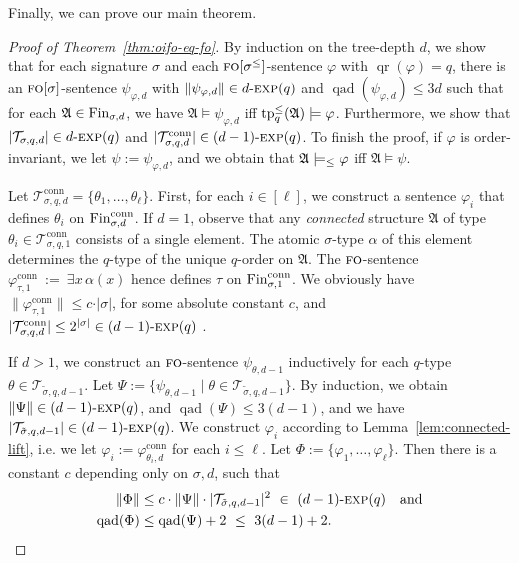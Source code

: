 \documentclass[11pt]{article}
\renewcommand{\phi}{\varphi}
\newcommand{\fin}{\textup{Fin}}
\newcommand{\conn}{\text{conn}}
\newcommand{\logic}[1]{\textsc{#1}}
\newcommand{\FO}{\logic{fo}}
\newcommand{\types}[1][\sigma,q,d]{\mathcal{T}_{#1}}
\newcommand{\ctypes}[1][\sigma,q,d]{\mathcal{T}^{\conn}_{#1}}
\newcommand{\size}[1]{\|#1\|}
\newcommand{\qr}[1]{\operatorname{qr}(#1)}
\newcommand{\qad}[1]{\operatorname{qad}(#1)}
\newcommand{\st}{\mathbin |}
\newcommand{\absval}[1]{\vert #1 \vert}
\newcommand{\leqsym}{\logic{\ensuremath{\leq}}}
\DeclareMathOperator{\tp}{tp}
\newcommand{\struct}[1]{\mathfrak{#1}}
\newcommand{\AS}{\struct{A}}
\newcommand{\set}[1]{\{#1\}}
\newcommand{\setc}[2]{\{#1 \st #2\}}
\newcommand{\nexp}[1][d]{\ensuremath{#1\textnormal{-}\textsc{exp}}}
\begin{document}
Finally, we can prove our main theorem.

\begin{proof}[Proof of Theorem~\ref{thm:oifo-eq-fo}]
  By induction on the tree-depth $d$, 
  we show that for each signature $\sigma$ and each $\FO[\sigma^{\leq}]$-sentence $\phi$ with $\qr{\phi} = q$, there is an $\FO[\sigma]$-sentence $\psi_{\phi,d}$ with $\size{\psi_{\phi,d}}\in \nexp[d](q)$ and $\qad{\psi_{\phi,d}}\leq 3d$ such that for each $\AS\in \fin_{\sigma,d}$,
  we have $\AS\models \psi_{\phi,d}$ iff $\tp^\leqsym_q(\AS)\models \phi$.
  Furthermore, we show that $\absval{\types[\sigma,q,d]}\in \nexp[d](q)$ and $\absval{\ctypes[\sigma,q,d]}\in \nexp[(d-1)](q)$.
  To finish the proof, if $\phi$ is order-invariant, we let $\psi := \psi_{\phi,d}$, and we obtain that $\AS \models_{\leqsym} \phi$ iff $\AS \models \psi$. 

  Let $\ctypes[\sigma, q, d]=\set{\theta_{1}, \ldots, \theta_{\ell}}$.
  First, for each $i\in [\ell]$, we construct a sentence $\phi_i$ that
  defines $\theta_i$ on $\fin^\conn_{\sigma,d}$. If $d=1$, observe
  that any \emph{connected} structure $\AS$ of
  type~$\theta_i\in\ctypes[\sigma,q,1]$ consists of a single element. The atomic $\sigma$-type $\alpha$
  of this element determines the $q$-type of the unique $q$-order on $\AS$.
  The $\FO{}$-sentence $\phi^{\conn}_{\tau,1} \ := \ \exists x\, \alpha(x)$
  hence defines $\tau$ on $\fin^\conn_{\sigma,1}$. We obviously have
  $\size{\phi^{\conn}_{\tau,1}} \leq c \cdot \absval{\sigma}$, for some absolute
  constant $c$, and $\absval{\ctypes} \leq 2^{\absval{\sigma}} \in \nexp[(d-1)](q)$ .

  If $d>1$, we construct an $\FO$-sentence $\psi_{\theta,d-1}$ inductively for each $q$-type $\theta\in\types[\tilde \sigma, q, d-1]$.
  Let $\Psi := \setc{\psi_{\theta,d-1}}{\theta\in\types[\tilde \sigma, q, d-1]}$. 
  By induction, we obtain $\size{\Psi} \in \nexp[(d-1)](q)$, and $\qad{\Psi} \leq 3(d-1)$, and we have $\absval{\types[\tilde \sigma, q, d-1]} \in \nexp[(d-1)](q)$.
  We construct $\phi_i$ according to Lemma~\ref{lem:connected-lift},
  i.e. we let $\phi_i:=\phi^{\conn}_{\theta_i,d}$ for each $i\leq
  \ell$. Let $\Phi := \set{\phi_1, \ldots, \phi_\ell}$.
  Then there is a constant $c$ depending only on $\sigma,d$,
  such that 
  \[
  \begin{split}
    \size{\Phi} &\leq c \cdot \size{\Psi} \cdot \absval{\types[\tilde \sigma, q, d-1]}^2 \ \in \ \nexp[(d-1)](q)
    \quad\text{and}
    \\
    \qad{\Phi} &\leq \qad{\Psi} + 2 \ \leq \ 3(d-1) +2.
  \end{split}
  \]


\end{proof}
\end{document}
